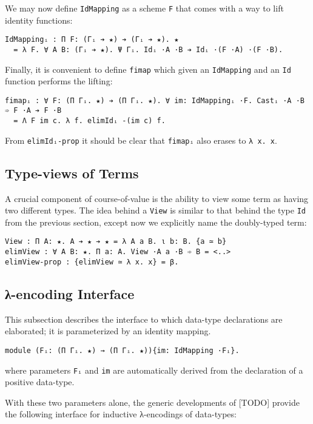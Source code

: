\documentclass{article}
\begin{document}
We may now define \verb;IdMapping; as a scheme \verb;F; that comes with a way to
lift identity functions:
\begin{verbatim}
IdMappingᵢ : Π F: (Γᵢ ➔ ★) ➔ (Γᵢ ➔ ★). ★
  = λ F. ∀ A B: (Γᵢ ➔ ★). Ψ Γᵢ. Idᵢ ·A ·B ➔ Idᵢ ·(F ·A) ·(F ·B).
\end{verbatim}

Finally, it is convenient to define \verb;fimap; which given an
\verb;IdMapping; and an \verb;Id; function performs the lifting:
\begin{verbatim}
fimapᵢ : ∀ F: (Π Γᵢ. ★) ➔ (Π Γᵢ. ★). ∀ im: IdMappingᵢ ·F. Castᵢ ·A ·B ➾ F ·A ➔ F ·B
  = Λ F im c. λ f. elimIdᵢ -(im c) f.
\end{verbatim}

From \verb;elimIdᵢ-prop; it should be clear that \verb;fimapᵢ; also erases to
\verb;λ x. x;.

\subsection{Type-views of Terms}
A crucial component of course-of-value is the ability to view some term as having
two different types. The idea behind a \verb;View; is similar to that behind the
type \verb;Id; from the previous section, except now we explicitly name the
doubly-typed term:
\begin{verbatim}
View : Π A: ★. A ➔ ★ ➔ ★ = λ A a B. ι b: B. {a ≃ b}
elimView : ∀ A B: ★. Π a: A. View ·A a ·B ➾ B = <..>
elimView-prop : {elimView ≃ λ x. x} = β.
\end{verbatim}

\subsection{λ-encoding Interface}
This subsection describes the interface to which data-type declarations are
elaborated; it is parameterized by an identity mapping.

\begin{verbatim}
module (Fᵢ: (Π Γᵢ. ★) → (Π Γᵢ. ★)){im: IdMapping ·Fᵢ}.
\end{verbatim}

\noindent where parameters \verb;Fᵢ; and \verb;im; are automatically derived from the
declaration of a positive data-type.

With these two parameters alone, the generic developments of [TODO] provide the
following interface for inductive λ-encodings of data-types:
\end{document}
